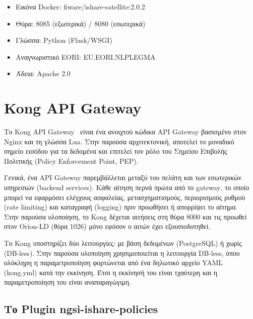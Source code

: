 \begin{itemize}
    \item Εικόνα \textlatin{Docker}:
    \textlatin{fiware/ishare-satellite:2.0.2}
    \item Θύρα: \textlatin{8085} (εξωτερικά) / \textlatin{8080}
    (εσωτερικά)
    \item Γλώσσα: \textlatin{Python} (\textlatin{Flask/WSGI})
    \item Αναγνωριστικό \textlatin{EORI}:
    \textlatin{EU.EORI.NLPLEGMA}
    \item Άδεια: \textlatin{Apache 2.0}
\end{itemize}

\section{\textlatin{Kong API Gateway}}
\label{sec:kong}

Το \textlatin{Kong API Gateway}~\cite{kong2023} είναι ένα ανοιχτού
κώδικα \textlatin{API Gateway} βασισμένο στον \textlatin{Nginx} και
τη γλώσσα \textlatin{Lua}. Στην παρούσα αρχιτεκτονική, αποτελεί το
μοναδικό σημείο εισόδου για τα δεδομένα και επιτελεί τον ρόλο του
Σημείου Επιβολής Πολιτικής (\textlatin{Policy Enforcement Point, PEP}).

Γενικά, ένα \textlatin{API Gateway} παρεμβάλλεται μεταξύ του πελάτη και
των εσωτερικών υπηρεσιών (\textlatin{backend services}). Κάθε αίτηση
περνά πρώτα από το \textlatin{gateway}, το οποίο μπορεί να εφαρμόσει
ελέγχους ασφαλείας, μετασχηματισμούς, περιορισμούς ρυθμού
(\textlatin{rate limiting}) και καταγραφή (\textlatin{logging}) πριν
προωθήσει ή απορρίψει το αίτημα. Στην παρούσα υλοποίηση, το \textlatin{Kong} δέχεται αιτήσεις στη
θύρα \textlatin{8000} και τις προωθεί στον \textlatin{Orion-LD}
(θύρα \textlatin{1026}) μόνο εφόσον ο αιτών έχει εξουσιοδοτηθεί.

Το \textlatin{Kong} υποστηρίζει δύο λειτουργίες: με βάση δεδομένων
(\textlatin{PostgreSQL}) ή χωρίς (\textlatin{DB-less}). Στην παρούσα
υλοποίηση χρησιμοποιείται η λειτουργία \textlatin{DB-less}, όπου
ολόκληρη η παραμετροποίηση φορτώνεται από ένα δηλωτικό αρχείο
\textlatin{YAML} (\textlatin{kong.yml}) κατά την εκκίνηση. Έτσι η εκκίνησή του είναι 
τχαύτερη και η παραμετροποίηση του είναι αναπαραγώγιμη.

\subsection{Το \textlatin{Plugin} \textlatin{ngsi-ishare-policies}}
\label{subsec:kong-plugin}

